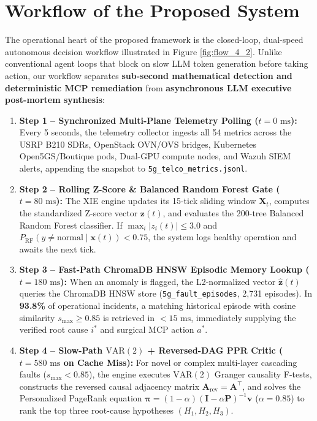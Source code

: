 \section{Workflow of the Proposed System}
The operational heart of the proposed framework is the closed-loop, dual-speed autonomous decision workflow illustrated in Figure \ref{fig:flow_4_2}. Unlike conventional agent loops that block on slow LLM token generation before taking action, our workflow separates \textbf{sub-second mathematical detection and deterministic MCP remediation} from \textbf{asynchronous LLM executive post-mortem synthesis}:

\begin{enumerate}
    \item \textbf{Step 1 -- Synchronized Multi-Plane Telemetry Polling ($t = 0\text{ ms}$):} Every 5 seconds, the telemetry collector ingests all 54 metrics across the USRP B210 SDRs, OpenStack OVN/OVS bridges, Kubernetes Open5GS/Boutique pods, Dual-GPU compute nodes, and Wazuh SIEM alerts, appending the snapshot to \texttt{5g\_telco\_metrics.jsonl}.
    \item \textbf{Step 2 -- Rolling Z-Score \& Balanced Random Forest Gate ($t = 80\text{ ms}$):} The XIE engine updates its 15-tick sliding window $\mathbf{X}_t$, computes the standardized Z-score vector $\mathbf{z}(t)$, and evaluates the 200-tree Balanced Random Forest classifier. If $\max_i |z_i(t)| \le 3.0$ and $P_{\text{RF}}(y \neq \text{normal} \mid \mathbf{x}(t)) < 0.75$, the system logs healthy operation and awaits the next tick.
    \item \textbf{Step 3 -- Fast-Path ChromaDB HNSW Episodic Memory Lookup ($t = 180\text{ ms}$):} When an anomaly is flagged, the L2-normalized vector $\hat{\mathbf{z}}(t)$ queries the ChromaDB HNSW store (\texttt{5g\_fault\_episodes}, 2,731 episodes). In \textbf{93.8\%} of operational incidents, a matching historical episode with cosine similarity $s_{\max} \ge 0.85$ is retrieved in $<15\text{ ms}$, immediately supplying the verified root cause $i^*$ and surgical MCP action $a^*$.
    \item \textbf{Step 4 -- Slow-Path $\text{VAR}(2)$ + Reversed-DAG PPR Critic ($t = 580\text{ ms}$ on Cache Miss):} For novel or complex multi-layer cascading faults ($s_{\max} < 0.85$), the engine executes $\text{VAR}(2)$ Granger causality F-tests, constructs the reversed causal adjacency matrix $\mathbf{A}_{\text{rev}} = \mathbf{A}^\top$, and solves the Personalized PageRank equation $\boldsymbol{\pi} = (1-\alpha)(\mathbf{I}-\alpha\mathbf{P})^{-1}\mathbf{v}$ ($\alpha = 0.85$) to rank the top three root-cause hypotheses $(H_1, H_2, H_3)$.

\end{enumerate}
